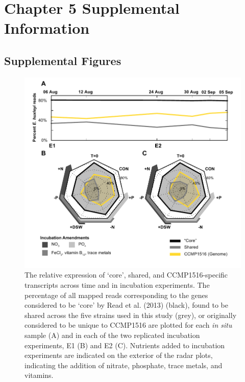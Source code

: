 \chapter{Chapter 5 Supplemental Information}
\clearpage
\section{Supplemental Figures}






\begin{figure}[p!]

  \centering
  \includegraphics[width=1\textwidth]{Images/C6_FigureS8_core_genes.pdf}
  \caption[The relative expression of `core', shared, and CCMP1516-specific transcripts across time and in incubation experiments]{The relative expression of `core', shared, and CCMP1516-specific transcripts across time and in incubation experiments. The percentage of all mapped reads corresponding to the genes considered to be `core' by Read et al. (2013) (black), found to be shared across the five strains used in this study (grey), or originally considered to be unique to CCMP1516 are plotted for each \textit{in situ} sample (A) and in each of the two replicated incubation experiments, E1 (B) and E2 (C). Nutrients added to incubation experiments are indicated on the exterior of the radar plots, indicating the addition of nitrate, phosphate, trace metals, and vitamins.}
    \label{fig:a5f8}
\end{figure}




